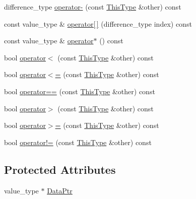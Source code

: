 \begin{DoxyCompactItemize}
\item 
difference\+\_\+type \hyperlink{classvct_fixed_stride_vector_const_iterator_a634eeb39656c15f1d91ee9caa8ca1ae7}{operator-\/} (const \hyperlink{classvct_fixed_stride_vector_const_iterator_ac60fc9d8c2af56a7f251d9a7040efa1e}{This\+Type} \&other) const 
\item 
const value\+\_\+type \& \hyperlink{classvct_fixed_stride_vector_const_iterator_a62efb78d7e84211ce59812998867f031}{operator\mbox{[}$\,$\mbox{]}} (difference\+\_\+type index) const 
\item 
const value\+\_\+type \& \hyperlink{classvct_fixed_stride_vector_const_iterator_a4e5be3b2f09d01b41fb383780db098c9}{operator$\ast$} () const 
\item 
bool \hyperlink{classvct_fixed_stride_vector_const_iterator_a8d2b30eb9dad78bd171454414c43ad74}{operator$<$} (const \hyperlink{classvct_fixed_stride_vector_const_iterator_ac60fc9d8c2af56a7f251d9a7040efa1e}{This\+Type} \&other) const 
\item 
bool \hyperlink{classvct_fixed_stride_vector_const_iterator_a597bd121dba5d1b3c43427100874b10d}{operator$<$=} (const \hyperlink{classvct_fixed_stride_vector_const_iterator_ac60fc9d8c2af56a7f251d9a7040efa1e}{This\+Type} \&other) const 
\item 
bool \hyperlink{classvct_fixed_stride_vector_const_iterator_a3dc617f3270778802522a9a6245e21fc}{operator==} (const \hyperlink{classvct_fixed_stride_vector_const_iterator_ac60fc9d8c2af56a7f251d9a7040efa1e}{This\+Type} \&other) const 
\item 
bool \hyperlink{classvct_fixed_stride_vector_const_iterator_a15f8e0e81cf5056d5f54057f1de90208}{operator$>$} (const \hyperlink{classvct_fixed_stride_vector_const_iterator_ac60fc9d8c2af56a7f251d9a7040efa1e}{This\+Type} \&other) const 
\item 
bool \hyperlink{classvct_fixed_stride_vector_const_iterator_a08e1db0e0498d3c1caa16cebf634bdde}{operator$>$=} (const \hyperlink{classvct_fixed_stride_vector_const_iterator_ac60fc9d8c2af56a7f251d9a7040efa1e}{This\+Type} \&other) const 
\item 
bool \hyperlink{classvct_fixed_stride_vector_const_iterator_a0f5547fa56ea4b5bc09334f6aac85b6b}{operator!=} (const \hyperlink{classvct_fixed_stride_vector_const_iterator_ac60fc9d8c2af56a7f251d9a7040efa1e}{This\+Type} \&other) const 
\end{DoxyCompactItemize}
\subsection*{Protected Attributes}
\begin{DoxyCompactItemize}
\item 
value\+\_\+type $\ast$ \hyperlink{classvct_fixed_stride_vector_const_iterator_a892f486c46b720c90ed18bb9bdb1793e}{Data\+Ptr}
\end{DoxyCompactItemize}


